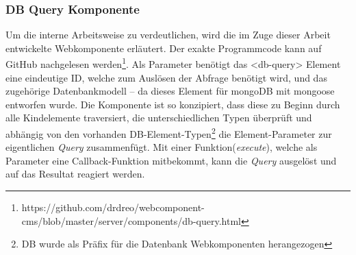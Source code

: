 \subsubsection{DB Query Komponente}
Um die interne Arbeitsweise zu verdeutlichen, wird die im Zuge dieser Arbeit entwickelte Webkomponente erläutert. Der exakte Programmcode kann auf GitHub nachgelesen werden\footnote{https://github.com/drdreo/webcomponent-cms/blob/master/server/components/db-query.html}. 
Als Parameter benötigt das <db-query> Element eine eindeutige ID, welche zum Auslösen der Abfrage benötigt wird, und das zugehörige  Datenbankmodell -- da dieses Element für mongoDB mit mongoose entworfen wurde.
Die Komponente ist so konzipiert, dass diese zu Beginn durch alle Kindelemente traversiert, die unterschiedlichen Typen überprüft und abhängig von den vorhanden DB-Element-Typen\footnote{DB wurde als Präfix für die Datenbank Webkomponenten herangezogen} die Element-Parameter zur eigentlichen \textit{Query} zusammenfügt. Mit einer Funktion(\textit{execute}), welche als Parameter eine Callback-Funktion mitbekommt, kann die  \textit{Query} ausgelöst und auf das Resultat reagiert werden.

